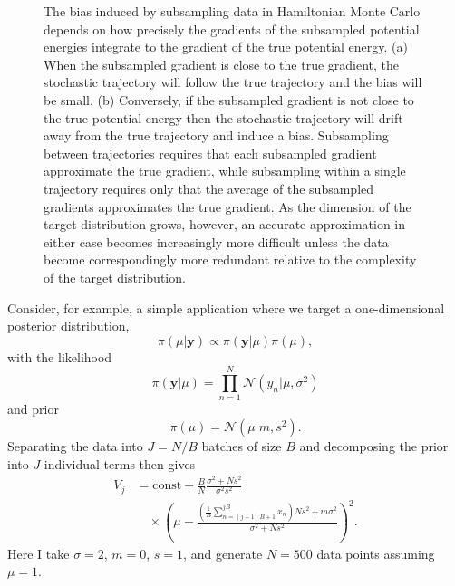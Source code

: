 \documentclass{article}
\begin{document}
\begin{figure}
{\begin{tikzpicture}[scale=0.22, thick]
\end{tikzpicture}
}
\caption{The bias induced by subsampling data in Hamiltonian Monte Carlo depends 
on how precisely the gradients of the subsampled potential energies integrate to the 
gradient of the true potential energy.  (a) When the subsampled gradient is close to the 
true gradient, the stochastic trajectory will follow the true trajectory and the bias will be small. 
(b) Conversely, if the subsampled gradient is not close to the true potential energy then the 
stochastic trajectory will drift away from the true trajectory and induce a bias.
Subsampling between trajectories requires that each subsampled gradient approximate
the true gradient, while subsampling within a single trajectory requires only that the
average of the subsampled gradients approximates the true gradient.  As the dimension of
the target distribution grows, however, an accurate approximation in either case
becomes increasingly more difficult unless the data become correspondingly more
redundant relative to the complexity of the target distribution.}
\label{fig:subsampled_gradients}
\end{figure}

Consider, for example, a simple application where we target a one-dimensional
posterior distribution,
%
\begin{equation} \label{posterior}
\pi \! \left( \mu | \mathbf{y} \right) \propto \pi \! \left( \mathbf{y} | \mu \right) \pi \! \left( \mu \right),
\end{equation}
%
with the likelihood
%
\begin{equation*}
\pi \! \left( \mathbf{y} | \mu \right) = \prod_{n = 1}^{N} \mathcal{N} \! \left( y_{n} | \mu, \sigma^{2} \right)
\end{equation*}
%
and prior
%
\begin{equation*}
\pi \! \left( \mu \right) = \mathcal{N} \! \left( \mu | m, s^{2} \right). 
\end{equation*}
%
Separating the data into $J = N / B$ batches of size $B$ and decomposing the
prior into $J$ individual terms then gives
%
\begin{align*}
V_{j} &= \mathrm{const} + 
\frac{B}{N} \frac{ \sigma^{2} + N s^{2}  }{ \sigma^{2} s^{2} }
\\
& \quad
\times \left( \mu - 
\frac{ \left( \frac{1}{B} \sum_{n = (j - 1) B + 1}^{j B} x_{n} \right) N s^{2}  + m \sigma^{2} }
{ \sigma^{2} + N s^{2} } 
\right)^{2}.
\end{align*}
%
Here I take $\sigma = 2$, $m = 0$, $s = 1$, and generate $N = 500$ data points
assuming $\mu = 1$.
\end{document}
